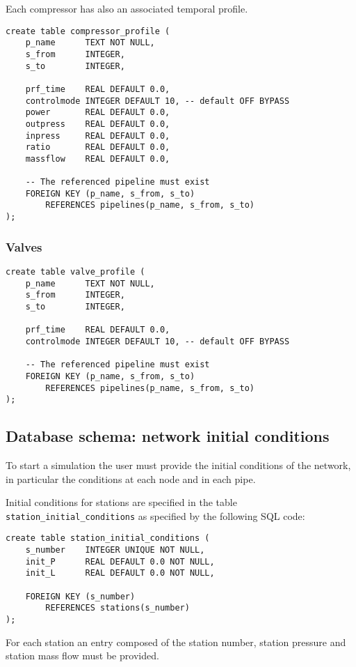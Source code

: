 \documentclass[10pt]{article}
\begin{document}
Each compressor has also an associated temporal profile.
\begin{verbatim}
create table compressor_profile (
    p_name      TEXT NOT NULL,
    s_from      INTEGER,
    s_to        INTEGER,

    prf_time    REAL DEFAULT 0.0,
    controlmode INTEGER DEFAULT 10, -- default OFF BYPASS
    power       REAL DEFAULT 0.0,
    outpress    REAL DEFAULT 0.0,
    inpress     REAL DEFAULT 0.0,
    ratio       REAL DEFAULT 0.0,
    massflow    REAL DEFAULT 0.0,

    -- The referenced pipeline must exist
    FOREIGN KEY (p_name, s_from, s_to)
        REFERENCES pipelines(p_name, s_from, s_to)
);
\end{verbatim}


\subsubsection{Valves}
\begin{verbatim}
create table valve_profile (
    p_name      TEXT NOT NULL,
    s_from      INTEGER,
    s_to        INTEGER,

    prf_time    REAL DEFAULT 0.0,
    controlmode INTEGER DEFAULT 10, -- default OFF BYPASS

    -- The referenced pipeline must exist
    FOREIGN KEY (p_name, s_from, s_to)
        REFERENCES pipelines(p_name, s_from, s_to)
);
\end{verbatim}

\subsection{Database schema: network initial conditions}

To start a simulation the user must provide the initial conditions of the network,
in particular the conditions at each node and in each pipe.

Initial conditions for stations are specified in the table \texttt{station\_initial\_conditions}
as specified by the following SQL code:
\begin{verbatim}
create table station_initial_conditions (
    s_number    INTEGER UNIQUE NOT NULL,
    init_P      REAL DEFAULT 0.0 NOT NULL,
    init_L      REAL DEFAULT 0.0 NOT NULL,

    FOREIGN KEY (s_number)
        REFERENCES stations(s_number)
);
\end{verbatim}
For each station an entry composed of the station number, station pressure and
station mass flow must be provided.
\end{document}
